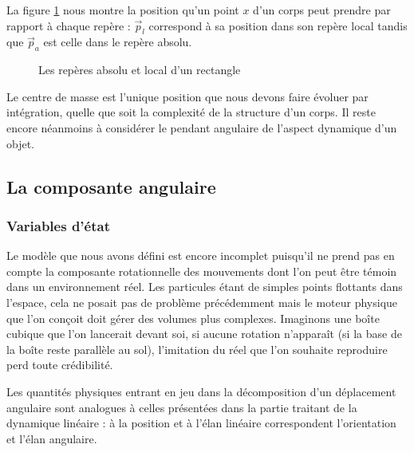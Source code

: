La figure \ref{reperelocal} nous montre la position qu'un point $x$
d'un corps peut prendre par rapport à chaque repère : $\vec{p}_l$
correspond à sa position dans son repère local tandis que $\vec{p}_a$
est celle dans le repère absolu.

\begin{figure}
  \centering
  
  \caption{Les repères absolu et local d'un rectangle}
  \label{reperelocal}
\end{figure}

Le centre de masse est l'unique position que nous devons faire évoluer
par intégration, quelle que soit la complexité de la structure d'un
corps. Il reste encore néanmoins à considérer le pendant angulaire de
l'aspect dynamique d'un objet.

\subsection{La composante angulaire}

\subsubsection{Variables d'état}

Le modèle que nous avons défini est encore incomplet puisqu'il ne
prend pas en compte la composante rotationnelle des mouvements dont
l'on peut être témoin dans un environnement réel. Les particules étant
de simples points flottants dans l'espace, cela ne posait pas de
problème précédemment mais le moteur physique que l'on conçoit doit
gérer des volumes plus complexes. Imaginons une boîte cubique que l'on
lancerait devant soi, si aucune rotation n'apparaît (si la base de la
boîte reste parallèle au sol), l'imitation du réel que l'on souhaite
reproduire perd toute crédibilité.

Les quantités physiques entrant en jeu dans la décomposition d'un
déplacement angulaire sont analogues à celles présentées dans la
partie traitant de la dynamique linéaire : à la position et à l'élan
linéaire correspondent l'orientation et l'élan angulaire.


